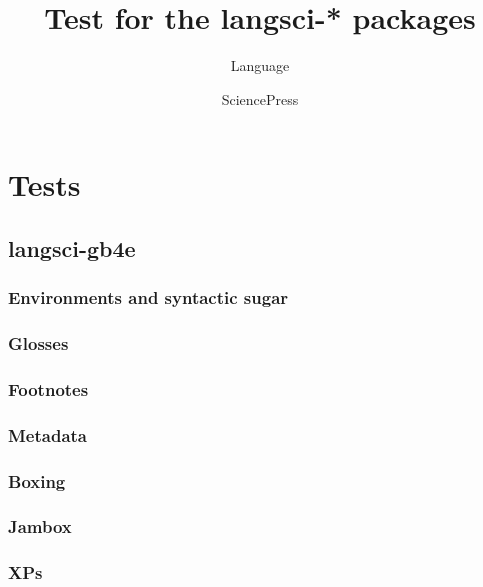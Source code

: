 \documentclass[output=book
	      ,nonflat      ,modfonts,
	      ,colorlinks
	      ,showindex
	      ]{langsci/langscibook}
\title{Test for the langsci-* packages}
\author{Language\and Science\lastand Press}
\begin{document}
\maketitle 
\tableofcontents
\mainmatter



\chapter{Tests} 
\section{langsci-gb4e}
\subsection{Environments and syntactic sugar}










 
\subsection{Glosses}





 
\subsection{Footnotes}


 
\subsection{Metadata}

\subsection{Boxing}
 
\subsection{Jambox}

\subsection{XPs}


  
\end{document}
